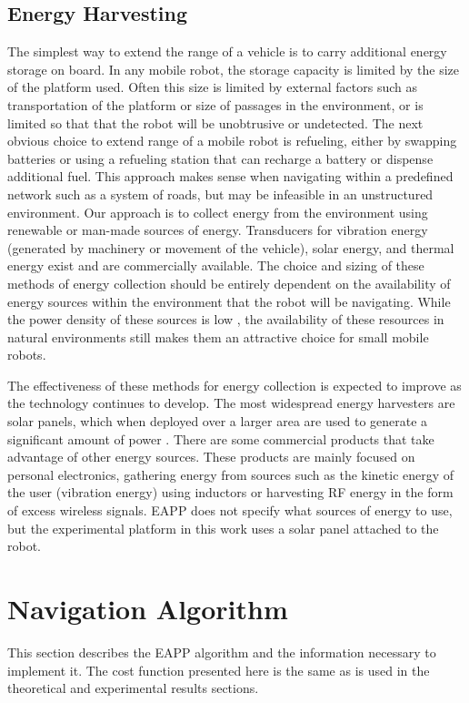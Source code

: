 \documentclass[journal]{IEEEtran}
\newcounter{col}
\begin{document}
\subsection{Energy Harvesting}
The simplest way to extend the range of a vehicle is to carry additional energy storage on board. 
In any mobile robot, the storage capacity is limited by the size of the platform used. 
Often this size is limited by external factors such as transportation of the platform or size of passages in the environment, or is limited so that that the robot will be unobtrusive or undetected. 
The next obvious choice to extend range of a mobile robot is refueling, either by swapping batteries or using a refueling station that can recharge a battery or dispense additional fuel. 
This approach makes sense when navigating within a predefined network such as a system of roads, but may be infeasible in an unstructured environment. 
Our approach is to collect energy from the environment using renewable or man-made sources of energy. 
Transducers for vibration energy (generated by machinery or movement of the vehicle)\cite{wickenheiser2010design}, solar energy, and thermal energy exist and are commercially available. 
The choice and sizing of these methods of energy collection should be entirely dependent on the availability of energy sources within the environment that the robot will be navigating. 
While the power density of these sources is low \cite{layton2008comparison}, the availability of these resources in natural environments still makes them an attractive choice for small mobile robots. 

The effectiveness of these methods for energy collection is expected to improve as the technology continues to develop. 
The most widespread energy harvesters are solar panels, which when deployed over a larger area are used to generate a significant amount of power \cite{DoE citation here}. 
There are some commercial products that take advantage of other energy sources. 
These products are mainly focused on personal electronics, gathering energy from sources such as the kinetic energy of the user (vibration energy) using inductors or harvesting RF energy in the form of excess wireless signals. 
EAPP does not specify what sources of energy to use, but the experimental platform in this work uses a solar panel attached to the robot.

\section{Navigation Algorithm}
This section describes the EAPP algorithm and the information necessary to implement it. The cost function presented here is the same as is used in the theoretical and experimental results sections.
\end{document}
